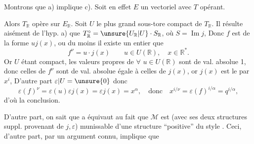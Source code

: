
 Montrons que a) implique c). Soit en effet  $E$ un vectoriel   avec $T$ opérant.


Alors $T_{\mathbb R}$ opère sur $E_{\mathbb R}$. Soit $U$ le plus grand sous-tore compact de $T_{\mathbb R}$. Il résulte aisément de l'hyp. a) que $T_{\mathbb R}^\circ=\unsure{U_{\mathbb R}|U}\cdot S_{\mathbb R}$, où $S=\operatorname{Im}j$,   Donc $f$ est de la forme $uj(x)$, ou du moins il existe un entier   que
\[
f^\nu=u\cdot j(x)\qquad u\in U(\mathbb R),\quad x\in\mathbb R^*.
\]
Or $U$ étant compact, les valeurs propres de $\forall$ $u\in U(\mathbb R)$ sont de val. absolue 1, donc celles de $f^\nu$ sont de val. absolue égale à celles de $j(x)$, or $j(x)$ est le    par $x^i$,  D'autre part  $\varepsilon|U=\unsure{0}$ donc
\[
\varepsilon(f)^\nu=\varepsilon(u)\varepsilon j(x)=\varepsilon j(x)=x^\alpha,
\quad\text{donc}\quad x^{i/\nu}=\varepsilon(f)^{i/\alpha}=q^{i/\alpha},
\]
d'où la conclusion.


D'autre part, on sait que a équivaut au fait que $\mathcal M$ est (avec ses deux structures suppl. provenant de $j,\varepsilon$) munissable d'une structure ``positive'' du style . Ceci, d'autre part, par un argument connu, implique que

